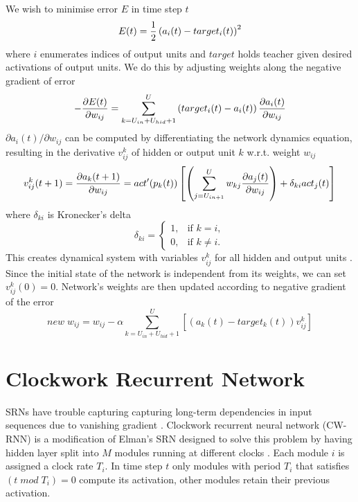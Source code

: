 \documentclass[12pt,oneside]{fithesis2}
\begin{document}
We wish to minimise error $E$ in time step $t$ %
$$E(t) = {1 \over 2}\left(a_i(t) - target_i(t)\right)^2$$
where $i$ enumerates indices of output units and $target$ holds teacher given desired activations of output units. We do this by adjusting weights along the negative gradient of error
$$-{{\partial E(t)} \over {\partial w_{ij}}} = \sum\limits_{k=U_{in}+U_{hid}+1}^U \left( target_i(t) - a_i(t) \right) {{\partial a_i(t)} \over {\partial w_{ij}}}$$
${\partial a_i(t)} / {\partial w_{ij}}$ can be computed by differentiating the network dynamics equation, resulting in the derivative $v^k_{ij}$ of hidden or output unit $k$ w.r.t. weight $w_{ij}$
$$ v^k_{ij}(t+1) = {{\partial a_k(t+1)} \over {\partial w_{ij}}} = act'(p_k(t)) \left[ \left(\sum\limits_{j=U_{in+1}}^{U}  w_{kj} {{\partial a_j(t)} \over {\partial w_{ij}}}\right) + \delta_{ki} act_j(t) \right] $$
where $\delta_{ki}$ is Kronecker's delta
$$\delta_{ki} =
    \begin{cases}
            1, &         \text{if } k=i,\\
            0, &         \text{if } k\neq i.
    \end{cases}$$
This creates dynamical system with variables $v^k_{ij}$ for all hidden and output units \cite{williams-zipser}. Since the initial state of the network is independent from its weights, we can set $v^k_{ij}(0) = 0$. Network's weights are then updated according to negative gradient of the error
$$new \; w_{ij} =  w_{ij} - \alpha \sum\limits_{k=U_{in}+U_{hid}+1}^U \left[ \left(a_k(t) - target_k(t) \right) v_{ij}^k \right]$$

\section{Clockwork Recurrent Network}
SRNs have trouble capturing capturing long-term dependencies in input sequences due to vanishing gradient \cite{vanishing-gradient}. Clockwork recurrent neural network (CW-RNN) is a modification of Elman's SRN designed to solve this problem by having hidden layer split into $M$ modules running at different clocks \cite{cw-rnn}.
Each module $i$ is assigned a clock rate $T_i$. In time step $t$ only modules with period $T_i$ that satisfies $(t \; mod \; T_i) = 0$ compute its activation, other modules retain their previous activation.  \par
\end{document}
